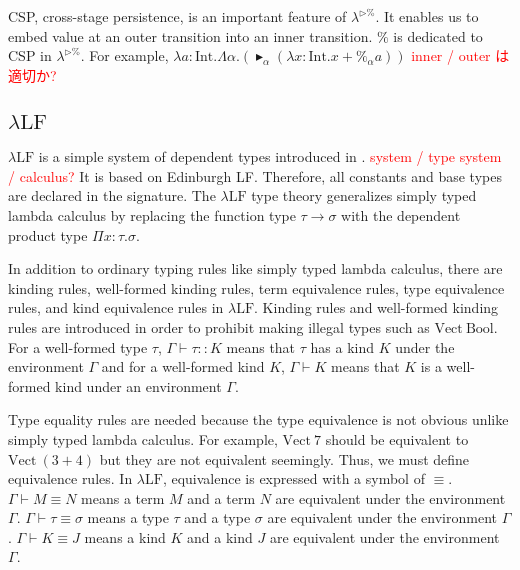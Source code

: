 \documentclass[runningheads]{llncs}
\newcommand{\red}[1]{\textcolor{red}{#1 }}
\newcommand{\LTP}{$\lambda^{\triangleright\%}$\xspace}
\newcommand{\LLF}{$\lambda\textrm{LF}$\xspace}
\newcommand{\G}{\Gamma}
\newcommand{\TB}{{\mathop{\blacktriangleright}}}
\newcommand{\E}{\equiv}
\newcommand{\I}{\textrm{Int}}
\begin{document}

CSP, cross-stage persistence, is an important feature of \LTP.
It enables us to embed value at an outer transition into an inner transition.
$\%$ is dedicated to CSP in \LTP.
For example, $\lambda a:\I.\Lambda\alpha.(\TB_\alpha (\lambda x:\I.x+\%_\alpha a))$
\red{inner / outer は適切か?}



\subsection{\LLF}

\LLF is a simple system of dependent types introduced in \cite{attapl}.
\red{system / type system / calculus?}
It is based on Edinburgh LF\cite{harper1993framework}.
Therefore, all constants and base types are declared in the signature.
The \LLF type theory generalizes simply typed lambda calculus
by replacing the function type $\tau\to\sigma$ with the dependent product type $\Pi x:\tau.\sigma$.

In addition to ordinary typing rules like simply typed lambda calculus,
there are kinding rules, well-formed kinding rules, term equivalence rules, type equivalence rules, and kind equivalence rules in \LLF.
Kinding rules and well-formed kinding rules are 
introduced in order to prohibit making illegal types such as $\textrm{Vect}\ \textrm{Bool}$.
For a well-formed type $\tau$, $\G \vdash \tau :: K$ means that $\tau$ has a kind $K$ under the environment $\G$ and 
for a well-formed kind $K$, $\G \vdash K$ means that $K$ is a well-formed kind under an environment $\G$.

Type equality rules are needed because the type equivalence is not obvious unlike simply typed lambda calculus.
For example, $\textrm{Vect}\ 7$ should be equivalent to $\textrm{Vect}\ (3+4)$
but they are not equivalent seemingly. Thus, we must define equivalence rules.
In \LLF, equivalence is expressed with a symbol of $\E$.
$\G \vdash M \E N$ means a term $M$ and a term $N$ are equivalent under the environment $\G$.
$\G \vdash \tau \E \sigma$ means a type $\tau$ and a type $\sigma$ are equivalent under the environment $\G$.
$\G \vdash K \E J$ means a kind $K$ and a kind $J$ are equivalent under the environment $\G$.
\end{document}
